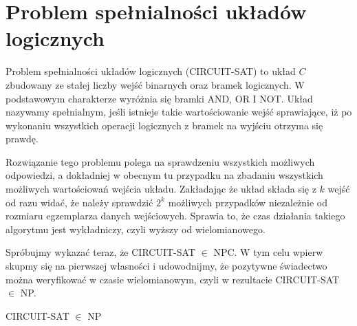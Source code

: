 \section{Problem spełnialności układów logicznych}

Problem spełnialności układów logicznych (CIRCUIT-SAT) to układ $C$ zbudowany ze stałej liczby wejść binarnych oraz bramek logicznych. W podstawowym charakterze wyróżnia się bramki AND, OR I NOT. Układ nazywamy spełnialnym, jeśli istnieje takie wartościowanie wejść sprawiające, iż po wykonaniu wszystkich operacji logicznych z bramek na wyjściu otrzyma się prawdę.

Rozwiązanie tego problemu polega na sprawdzeniu wszystkich możliwych odpowiedzi, a dokładniej w obecnym tu przypadku na zbadaniu wszystkich możliwych wartościowań wejścia układu. Zakładając że układ składa się z $k$ wejść od razu widać, że należy sprawdzić $2^{k}$ możliwych przypadków niezależnie od rozmiaru egzemplarza danych wejściowych. Sprawia to, że czas działania takiego algorytmu jest wykładniczy, czyli wyższy od wielomianowego.

Spróbujmy wykazać teraz, że CIRCUIT-SAT $\in$ NPC. W tym celu wpierw skupmy się na pierwszej własności i udowodnijmy, że pozytywne świadectwo można weryfikować w czasie wielomianowym, czyli w rezultacie CIRCUIT-SAT $\in$ NP.

\begin{lem} 
CIRCUIT-SAT $\in$ NP
\end{lem}

